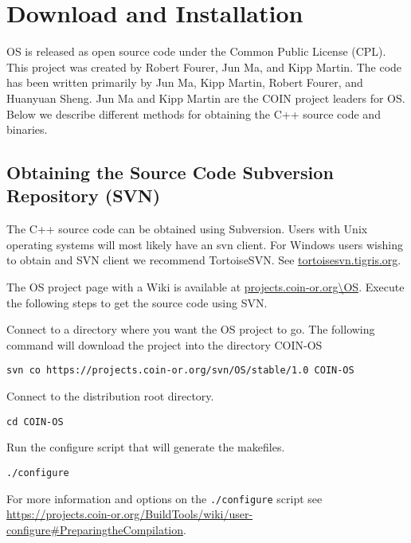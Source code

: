 \documentclass[11pt]{article}
\renewcommand{\_}{{\char"5F}}
\renewcommand{\{}{{\char"7B}}
\renewcommand{\}}{{\char"7D}}
\renewcommand{\^}{{\char"0D}}
\renewcommand{\'}{{\char"0D}}
\begin{document}
\section{Download and Installation}\label{section:download}

OS is released as open source code under the Common Public License (CPL). This project was created by Robert Fourer, Jun Ma, and Kipp Martin. The code has been written primarily by Jun Ma, Kipp Martin, Robert Fourer, and Huanyuan Sheng.  Jun Ma and Kipp Martin are the COIN project leaders for OS. Below we describe different methods for obtaining the C++ source code and binaries. 

\subsection{Obtaining the Source Code Subversion Repository (SVN)}\label{section:svn}

The C++ source code can be obtained using Subversion.  Users with Unix operating systems will most likely have an svn client. For Windows users wishing to obtain and SVN client we recommend  TortoiseSVN.  See \url{tortoisesvn.tigris.org}.

The OS project page with a Wiki is available at \url{projects.coin-or.org\OS}. Execute the following steps to get the source code using SVN.

  Connect to a directory where you want the OS project to go.  The following command will download the project into the directory COIN-OS

\begin{verbatim}
svn co https://projects.coin-or.org/svn/OS/stable/1.0 COIN-OS
\end{verbatim}

  Connect to the distribution root directory.

\begin{verbatim}
cd COIN-OS
\end{verbatim}


 Run the configure script that will generate the makefiles. 

\begin{verbatim}
./configure
\end{verbatim}


For more information and options on the {\tt ./configure} script see
\url{https://projects.coin-or.org/BuildTools/wiki/user-configure#PreparingtheCompilation}.
\end{document}
